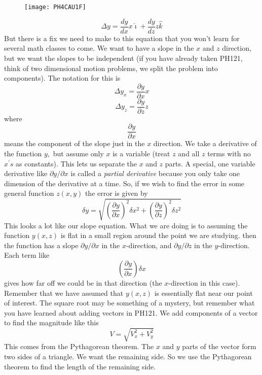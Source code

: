 \begin{figure}[h!]
	\centering
    \texttt{[image: PH4CAU1F]}
\end{figure}

\begin{equation*}
\Delta y=\frac{dy}{dx}x\hat{\imath}+\frac{dy}{dz}z\hat{k}
\end{equation*}%
But there is a fix we need to make to this equation that you won't learn for
several math classes to come. We want to have a slope in the $x$ and $z$
direction, but we want the slopes to be independent (if you have already
taken PH121, think of two dimensional motion problems, we split the problem
into components). The notation for this is%
\begin{equation*}
\Delta y_{x}=\frac{\partial y}{\partial x}x
\end{equation*}%
\begin{equation*}
\Delta y_{z}=\frac{\partial y}{\partial z}z
\end{equation*}%
where 
\begin{equation*}
\frac{\partial y}{\partial x}
\end{equation*}%
means the component of the slope just in the $x$ direction. We take a
derivative of the function $y,$ but assume only $x$ is a variable (treat $z$
and all $z$ terms with no $x^{\prime }s$ as constants). This lets us
separate the $x$ and $z$ parts. A special, one variable derivative like $%
\partial y/\partial x$ is called a \emph{partial derivative} because you
only take one dimension of the derivative at a time. So, if we wish to find
the error in some general function $z\left( x,y\right) $ the error is given
by 
\begin{equation*}
\delta y=\sqrt{\left( \frac{\partial y}{\partial x}\right) ^{2}\delta
x^{2}+\left( \frac{\partial y}{\partial z}\right) ^{2}\delta z^{2}}
\end{equation*}%
This looks a lot like our slope equation. What we are doing is to assuming
the function $y\left( x,z\right) $ is flat in a small region around the
point we are studying. then the function has a slope $\partial y/\partial x$
in the $x$-direction, and $\partial y/\partial z$ in the $y$-direction. Each
term like 
\begin{equation*}
\left( \frac{\partial y}{\partial x}\right) \delta x
\end{equation*}%
gives how far off we could be in that direction (the $x$-direction in this
case). Remember that we have assumed that $y\left( x,z\right) $ is
essentially flat near our point of interest. The square root may be
something of a mystery, but remember what you have learned about adding
vectors in PH121. We add components of a vector to find the magnitude like
this 
\begin{equation*}
V=\sqrt{V_{x}^{2}+V_{y}^{2}}
\end{equation*}%
This comes from the Pythagorean theorem. The $x$ and $y$ parts of the vector
form two sides of a triangle. We want the remaining side. So we use the
Pythagorean theorem to find the length of the remaining side.

